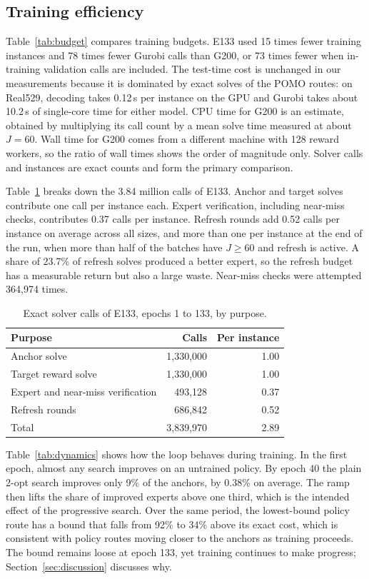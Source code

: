 \documentclass[preprint,12pt,authoryear]{elsarticle}
\begin{document}
\subsection{Training efficiency}

Table~\ref{tab:budget} compares training budgets. E133 used 15 times fewer training instances and 78 times fewer Gurobi calls than G200, or 73 times fewer when in-training validation calls are included. The test-time cost is unchanged in our measurements because it is dominated by exact solves of the POMO routes: on Real529, decoding takes 0.12\,s per instance on the GPU and Gurobi takes about 10.2\,s of single-core time for either model. CPU time for G200 is an estimate, obtained by multiplying its call count by a mean solve time measured at about $J = 60$. Wall time for G200 comes from a different machine with 128 reward workers, so the ratio of wall times shows the order of magnitude only. Solver calls and instances are exact counts and form the primary comparison.

Table~\ref{tab:calls} breaks down the 3.84 million calls of E133. Anchor and target solves contribute one call per instance each. Expert verification, including near-miss checks, contributes 0.37 calls per instance. Refresh rounds add 0.52 calls per instance on average across all sizes, and more than one per instance at the end of the run, when more than half of the batches have $J \ge 60$ and refresh is active. A share of 23.7\% of refresh solves produced a better expert, so the refresh budget has a measurable return but also a large waste. Near-miss checks were attempted 364,974 times.

\begin{table}[t]
\centering
\caption{Exact solver calls of E133, epochs 1 to 133, by purpose.}
\label{tab:calls}
\small
\begin{tabular}{lrr}
\toprule
Purpose & Calls & Per instance \\
\midrule
Anchor solve & 1,330,000 & 1.00 \\
Target reward solve & 1,330,000 & 1.00 \\
Expert and near-miss verification & 493,128 & 0.37 \\
Refresh rounds & 686,842 & 0.52 \\
Total & 3,839,970 & 2.89 \\
\bottomrule
\end{tabular}
\end{table}

Table~\ref{tab:dynamics} shows how the loop behaves during training. In the first epoch, almost any search improves on an untrained policy. By epoch 40 the plain 2-opt search improves only 9\% of the anchors, by 0.38\% on average. The ramp then lifts the share of improved experts above one third, which is the intended effect of the progressive search. Over the same period, the lowest-bound policy route has a bound that falls from 92\% to 34\% above its exact cost, which is consistent with policy routes moving closer to the anchors as training proceeds. The bound remains loose at epoch 133, yet training continues to make progress; Section~\ref{sec:discussion} discusses why.
\end{document}
